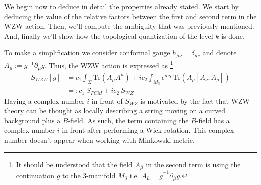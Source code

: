\documentclass[a4paper,12pt]{article}
\numberwithin{equation}{section}
\numberwithin{thm}{section}
\numberwithin{exm}{section}
\newcommand{\p}{\partial}
\newcommand{\tr}{\mathrm{Tr}}
\newcommand{\wt}{\widetilde}
\newcommand{\mo}{^{-1}}
\newcommand{\<}{{\langle}}
\renewcommand{\>}{{\rangle}}
\renewcommand{\d}{{\delta}}
\newcommand{\e}{{\epsilon}}
\newcommand{\m}{{\mu}}
\newcommand{\n}{{\nu}}
\renewcommand{\S}{{\Sigma}}
\newcommand{\mb}{{\bar\mu}}
\newcommand{\nb}{{\bar\nu}}
\newcommand{\rb}{{\bar\rho}}
\begin{document}
We begin now to deduce in detail the properties already stated. We start by deducing the value of the relative factors between the first and second term in the WZW action. Then, we'll compute the ambiguity that was previously mentioned. And, finally we'll show how the topological quantization of the level $k$ is done.

To make a simplification we consider conformal gauge $h_{\m\n} = \d_{\mu\nu}$ and denote $A_\m := g\mo\p_\m g$. Thus, the WZW action is expressed as%
\footnote{It should be understood that the field $A_\mb$ in the second term is using the continuation $\wt g$ to the 3-manifold $M_3$ i.e. $A_\mb = \wt g\mo \p_\mb \wt g$.}
	\begin{align}
	S_{WZW}[g] & = c_1 \int_\S \tr(A_\m A^\m) + i c_2  \int_{M_3} \e^{\mb\nb\rb}\tr(A_\mb [A_\nb, A_\rb]) \\
	& =: c_1\ S_{PCM} + i c_2\ S_{WZ}
	\end{align}
Having a complex number $i$ in front of $S_{WZ}$ is motivated by the fact that WZW theory can be thought as locally describing a string moving on a curved background plus a $B$-field. As such, the term containing the $B$-field has a complex number $i$ in front after performing a Wick-rotation. This complex number doesn't appear when working with Minkowski metric.
\end{document}
